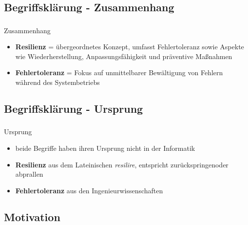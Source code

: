 \subsection{Begriffsklärung - Zusammenhang}

\begin{frame}
    \frametitle{\insertsection}
    \framesubtitle{\insertsubsection}

    \begin{block}{Zusammenhang}
        \begin{itemize}
            \item \textbf{Resilienz} = übergeordnetes Konzept, umfasst Fehlertoleranz sowie Aspekte wie Wiederherstellung, Anpassungsfähigkeit und präventive Maßnahmen
            \item \textbf{Fehlertoleranz} = Fokus auf unmittelbarer Bewältigung von Fehlern während des Systembetriebs
        \end{itemize}
    \end{block}
\end{frame}

\subsection{Begriffsklärung - Ursprung}

\begin{frame}
    \frametitle{\insertsection}
    \framesubtitle{\insertsubsection}

    \begin{block}{Ursprung}
        \begin{itemize}
            \item beide Begriffe haben ihren Ursprung nicht in der Informatik
            \item \textbf{Resilienz} aus dem Lateinischen \textit{resilire}, entspricht \glqq zurückspringen\grqq oder  \glqq abprallen\grqq
            \item \textbf{Fehlertoleranz} aus den Ingenieurwissenschaften
        \end{itemize}
    \end{block}
\end{frame}

\subsection{Motivation}

